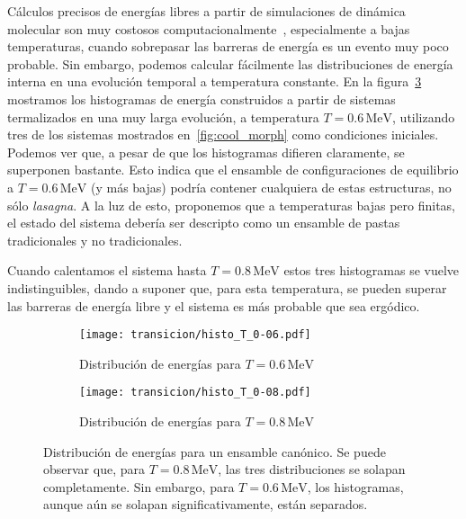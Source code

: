 Cálculos precisos de energías libres a partir de simulaciones de dinámica molecular son muy costosos computacionalmente~\cite[pp. 167-200]{frenkel_understanding_2001}, especialmente a bajas temperaturas, cuando sobrepasar las barreras de energía es un evento muy poco probable.
Sin embargo, podemos calcular fácilmente las distribuciones de energía interna en una evolución temporal a temperatura constante.
En la figura~\ref{fig:histo} mostramos los histogramas de energía construidos a partir de sistemas termalizados en una muy larga evolución, a temperatura $T=0.6\,\text{MeV}$, utilizando tres de los sistemas mostrados en~\ref{fig:cool_morph} como condiciones iniciales.
Podemos ver que, a pesar de que los histogramas difieren claramente, se superponen bastante.
Esto indica que el ensamble de configuraciones de equilibrio a $T=0.6\,\text{MeV}$ (y más bajas) podría contener cualquiera de estas estructuras, no sólo \emph{lasagna}.
A la luz de esto, proponemos que a temperaturas bajas pero finitas, el estado del sistema debería ser descripto como un ensamble de pastas tradicionales y no tradicionales.

Cuando calentamos el sistema hasta $T=0.8\,\text{MeV}$ estos tres histogramas se vuelve indistinguibles, dando a suponer que, para esta temperatura, se pueden superar las barreras de energía libre y el sistema es más probable que sea ergódico.

\begin{figure}[floatfix]%
  \centering
  \begin{subfigure}[h!]{0.45\columnwidth}
    \texttt{[image: transicion/histo\_T\_0-06.pdf]}
    \caption{Distribución de energías para $T=0.6\,\text{MeV}$}
\label{subfig:histo_T_0-06}
  \end{subfigure}
  \begin{subfigure}[h!]{0.45\columnwidth}
    \texttt{[image: transicion/histo\_T\_0-08.pdf]}
    \caption{Distribución de energías para $T=0.8\,\text{MeV}$}
\label{subfig:histo_T_0-08}
  \end{subfigure}
  \caption{Distribución de energías para un ensamble canónico.
    Se puede observar que, para $T=0.8\,\text{MeV}$, las tres distribuciones se solapan completamente.
    Sin embargo, para $T=0.6\,\text{MeV}$, los histogramas, aunque aún se solapan significativamente, están separados.}
\label{fig:histo}
\end{figure}

